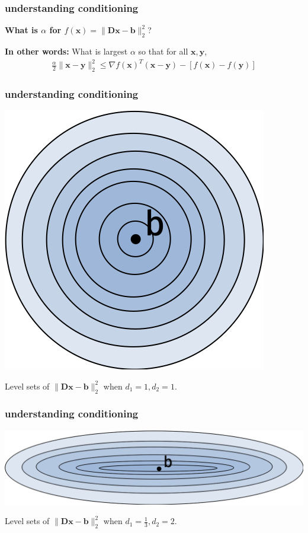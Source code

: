 \documentclass[compress]{beamer}
\newcommand{\bv}[1]{\mathbf{#1}}
\begin{document}
\begin{frame}[t]
	\frametitle{understanding conditioning}
	\begin{center}
		\textbf{What is $\alpha$ for $f(\bv{x}) = \|\bv{D}\bv{x} - \bv{b}\|_2^2$}?
	\end{center}
	
	\textbf{In other words:} What is largest $\alpha$ so that for all $\bv{x}, \bv{y}$, 
	\begin{align*}
		{\frac{\alpha}{2}}\|\bv{x} - \bv{y}\|_2^2 \leq \nabla f(\bv{x})^T(\bv{x} - \bv{y}) - \left[f(\bv{x}) - f(\bv{y})\right] 
	\end{align*}
\end{frame}

\begin{frame}[t]
	\frametitle{understanding conditioning}
	\begin{center}
		\includegraphics[width=.5\textwidth]{perfect_conditioning.png}
		
		Level sets of $\|\bv{D}\bv{x} - \bv{b}\|_2^2$ when $d_1 = 1, d_2 = 1$. 
	\end{center}
\end{frame}

\begin{frame}[t]
	\frametitle{understanding conditioning}
	\begin{center}
		\includegraphics[width=\textwidth]{poor_conditioning.png}
		
		Level sets of $\|\bv{D}\bv{x} - \bv{b}\|_2^2$ when $d_1 = \frac{1}{3}, d_2 = 2$. 
	\end{center}
\end{frame}
\end{document}
